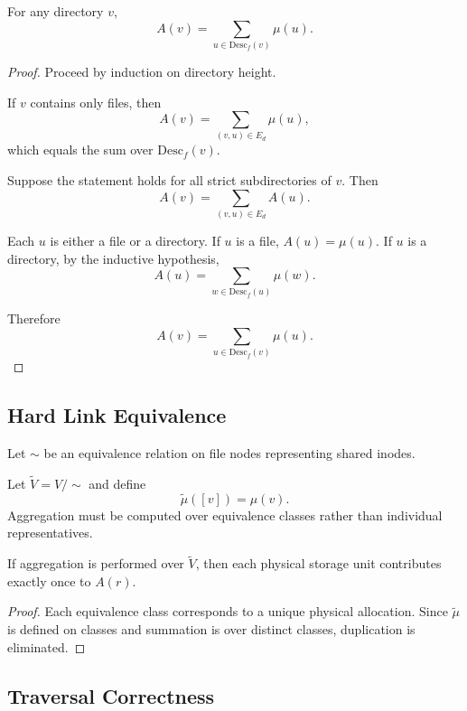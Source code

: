 \begin{proposition}
For any directory $v$,
\[
A(v) = \sum_{u \in \mathrm{Desc}_f(v)} \mu(u).
\]
\end{proposition}

\begin{proof}
Proceed by induction on directory height.

If $v$ contains only files, then
\[
A(v) = \sum_{(v,u)\in E_d} \mu(u),
\]
which equals the sum over $\mathrm{Desc}_f(v)$.

Suppose the statement holds for all strict subdirectories of $v$.
Then
\[
A(v) = \sum_{(v,u)\in E_d} A(u).
\]

Each $u$ is either a file or a directory.
If $u$ is a file, $A(u)=\mu(u)$.
If $u$ is a directory, by the inductive hypothesis,
\[
A(u) = \sum_{w \in \mathrm{Desc}_f(u)} \mu(w).
\]

Therefore
\[
A(v) = \sum_{u \in \mathrm{Desc}_f(v)} \mu(u).
\]
\end{proof}

\subsection*{Hard Link Equivalence}

Let $\sim$ be an equivalence relation on file nodes representing shared inodes.

\begin{definition}
Let $\tilde{V} = V / \sim$ and define
\[
\tilde{\mu}([v]) = \mu(v).
\]
Aggregation must be computed over equivalence classes rather than individual representatives.
\end{definition}

\begin{theorem}
If aggregation is performed over $\tilde{V}$, then each physical storage unit contributes exactly once to $A(r)$.
\end{theorem}

\begin{proof}
Each equivalence class corresponds to a unique physical allocation.
Since $\tilde{\mu}$ is defined on classes and summation is over distinct classes,
duplication is eliminated.
\end{proof}

\subsection*{Traversal Correctness}

